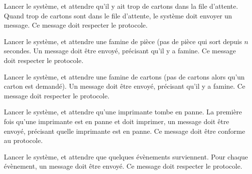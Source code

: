 {Lancer le système, et attendre qu'il y ait trop de cartons dans la file
    d'attente.}
{Quand trop de cartons sont dans le file d'attente, le système doit envoyer un
    message. Ce message doit respecter le protocole.}

{Lancer le système, et attendre une famine de pièce (pas de pièce qui sort
depuis $n$ secondes.}
{Un message doit être envoyé, précisant qu'il y a famine. Ce message doit
respecter le protocole.}

{Lancer le système, et attendre une famine de cartons (pas de cartons alors
qu'un carton est demandé).}
{Un message doit être envoyé, précisant qu'il y a famine. Ce message doit
respecter le protocole.}

{Lancer le système, et attendre qu'une imprimante tombe en panne.}
{La première fois qu'une imprimante est en panne et doit imprimer, un message
doit être envoyé, précisant quelle imprimante est en panne. Ce message doit
être conforme au protocole.}

{Lancer le système, et attendre que quelques évènements surviennent.}
{Pour chaque évènement, un message doit être envoyé. Ce message doit respecter
le protocole.}
